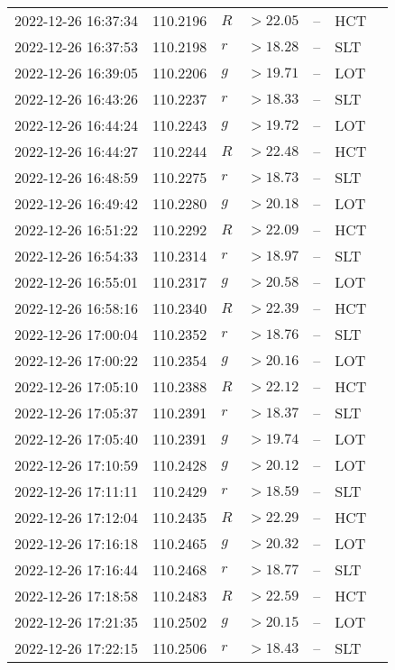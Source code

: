 \documentclass{nature_plusfigure}
\begin{document}
\begin{supplement}
\begin{center}
\begin{longtable}{lllllll}
2022-12-26 16:37:34 & 110.2196 & $R$ & $>22.05$ & -- & HCT &  \\ 
2022-12-26 16:37:53 & 110.2198 & $r$ & $>18.28$ & -- & SLT &  \\ 
2022-12-26 16:39:05 & 110.2206 & $g$ & $>19.71$ & -- & LOT &  \\ 
2022-12-26 16:43:26 & 110.2237 & $r$ & $>18.33$ & -- & SLT &  \\ 
2022-12-26 16:44:24 & 110.2243 & $g$ & $>19.72$ & -- & LOT &  \\ 
2022-12-26 16:44:27 & 110.2244 & $R$ & $>22.48$ & -- & HCT &  \\ 
2022-12-26 16:48:59 & 110.2275 & $r$ & $>18.73$ & -- & SLT &  \\ 
2022-12-26 16:49:42 & 110.2280 & $g$ & $>20.18$ & -- & LOT &  \\ 
2022-12-26 16:51:22 & 110.2292 & $R$ & $>22.09$ & -- & HCT &  \\ 
2022-12-26 16:54:33 & 110.2314 & $r$ & $>18.97$ & -- & SLT &  \\ 
2022-12-26 16:55:01 & 110.2317 & $g$ & $>20.58$ & -- & LOT &  \\ 
2022-12-26 16:58:16 & 110.2340 & $R$ & $>22.39$ & -- & HCT &  \\ 
2022-12-26 17:00:04 & 110.2352 & $r$ & $>18.76$ & -- & SLT &  \\ 
2022-12-26 17:00:22 & 110.2354 & $g$ & $>20.16$ & -- & LOT &  \\ 
2022-12-26 17:05:10 & 110.2388 & $R$ & $>22.12$ & -- & HCT &  \\ 
2022-12-26 17:05:37 & 110.2391 & $r$ & $>18.37$ & -- & SLT &  \\ 
2022-12-26 17:05:40 & 110.2391 & $g$ & $>19.74$ & -- & LOT &  \\ 
2022-12-26 17:10:59 & 110.2428 & $g$ & $>20.12$ & -- & LOT &  \\ 
2022-12-26 17:11:11 & 110.2429 & $r$ & $>18.59$ & -- & SLT &  \\ 
2022-12-26 17:12:04 & 110.2435 & $R$ & $>22.29$ & -- & HCT &  \\ 
2022-12-26 17:16:18 & 110.2465 & $g$ & $>20.32$ & -- & LOT &  \\ 
2022-12-26 17:16:44 & 110.2468 & $r$ & $>18.77$ & -- & SLT &  \\ 
2022-12-26 17:18:58 & 110.2483 & $R$ & $>22.59$ & -- & HCT &  \\ 
2022-12-26 17:21:35 & 110.2502 & $g$ & $>20.15$ & -- & LOT &  \\ 
2022-12-26 17:22:15 & 110.2506 & $r$ & $>18.43$ & -- & SLT &  \\ 

\end{longtable}
\end{center}
\end{supplement}
\end{document}
